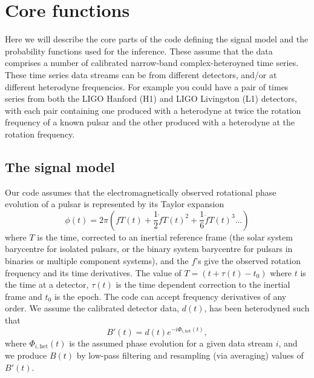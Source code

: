 \section{Core functions}

Here we will describe the core parts of the code defining the signal model and the probability functions used
for the inference. These assume that the data comprises a number of calibrated narrow-band complex-heteroyned time
series. These time series data streams can be from different detectors, and/or at different heterodyne
frequencies. For example you could have a pair of times series from both the LIGO Hanford (H1) and LIGO
Livingston (L1) detectors, with each pair containing one produced with a heterodyne at twice the rotation frequency of a known
pulsar and the other produced with a heterodyne at the rotation frequency.

\subsection{The signal model}\label{sec:model}

Our code assumes that the electromagnetically observed rotational phase evolution of a pulsar is represented by its Taylor expansion
\begin{equation}
\phi(t) = 2\pi\left(fT(t) + \frac{1}{2}\dot{f}T(t)^2 + \frac{1}{6}\ddot{f}T(t)^3 \ldots \right)
\end{equation}
where $T$ is the time, corrected to an inertial reference frame (the solar system barycentre
for isolated pulsars, or the binary system barycentre for pulsars in binaries or multiple component systems), and the $f$'s give
the observed rotation frequency and its time derivatives. The value of $T = (t+\tau(t)-t_0)$ where $t$ is the
time at a detector, $\tau(t)$ is the time dependent correction to the inertial frame and $t_0$ is the epoch.
The code can accept frequency derivatives of any order. We assume the
calibrated detector data, $d(t)$, has been heterodyned such that
\begin{equation}
B'(t) = d(t)e^{-i\Phi_{i,\text{het}}(t)},
\end{equation}
where $\Phi_{i,\text{het}}(t)$ is the assumed phase evolution for a given data stream $i$, and we produce $B(t)$ by
low-pass filtering and resampling (via averaging) values of $B'(t)$.

